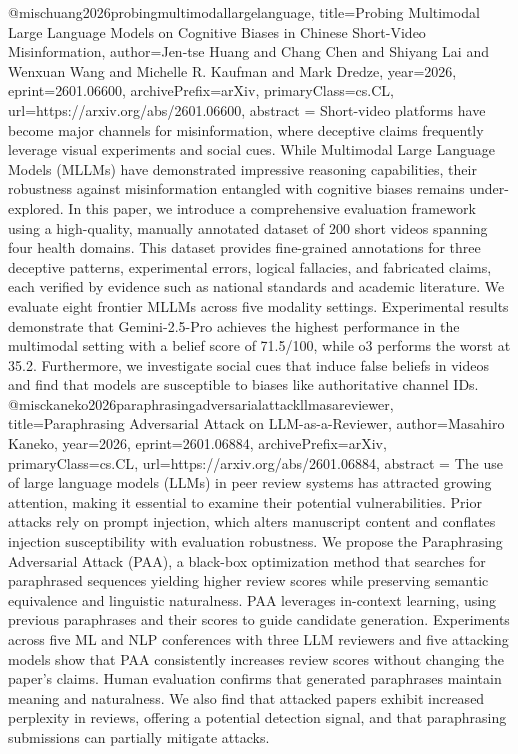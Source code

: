 {}@misc{huang2026probingmultimodallargelanguage,
      title={Probing Multimodal Large Language Models on Cognitive Biases in Chinese Short-Video Misinformation}, 
      author={Jen-tse Huang and Chang Chen and Shiyang Lai and Wenxuan Wang and Michelle R. Kaufman and Mark Dredze},
      year={2026},
      eprint={2601.06600},
      archivePrefix={arXiv},
      primaryClass={cs.CL},
      url={https://arxiv.org/abs/2601.06600},
      abstract = {Short-video platforms have become major channels for misinformation, where deceptive claims frequently leverage visual experiments and social cues. While Multimodal Large Language Models (MLLMs) have demonstrated impressive reasoning capabilities, their robustness against misinformation entangled with cognitive biases remains under-explored. In this paper, we introduce a comprehensive evaluation framework using a high-quality, manually annotated dataset of 200 short videos spanning four health domains. This dataset provides fine-grained annotations for three deceptive patterns, experimental errors, logical fallacies, and fabricated claims, each verified by evidence such as national standards and academic literature. We evaluate eight frontier MLLMs across five modality settings. Experimental results demonstrate that Gemini-2.5-Pro achieves the highest performance in the multimodal setting with a belief score of 71.5/100, while o3 performs the worst at 35.2. Furthermore, we investigate social cues that induce false beliefs in videos and find that models are susceptible to biases like authoritative channel IDs.}
}@misc{kaneko2026paraphrasingadversarialattackllmasareviewer,
      title={Paraphrasing Adversarial Attack on LLM-as-a-Reviewer}, 
      author={Masahiro Kaneko},
      year={2026},
      eprint={2601.06884},
      archivePrefix={arXiv},
      primaryClass={cs.CL},
      url={https://arxiv.org/abs/2601.06884},
      abstract = {The use of large language models (LLMs) in peer review systems has attracted growing attention, making it essential to examine their potential vulnerabilities. Prior attacks rely on prompt injection, which alters manuscript content and conflates injection susceptibility with evaluation robustness. We propose the Paraphrasing Adversarial Attack (PAA), a black-box optimization method that searches for paraphrased sequences yielding higher review scores while preserving semantic equivalence and linguistic naturalness. PAA leverages in-context learning, using previous paraphrases and their scores to guide candidate generation. Experiments across five ML and NLP conferences with three LLM reviewers and five attacking models show that PAA consistently increases review scores without changing the paper's claims. Human evaluation confirms that generated paraphrases maintain meaning and naturalness. We also find that attacked papers exhibit increased perplexity in reviews, offering a potential detection signal, and that paraphrasing submissions can partially mitigate attacks.}
}
